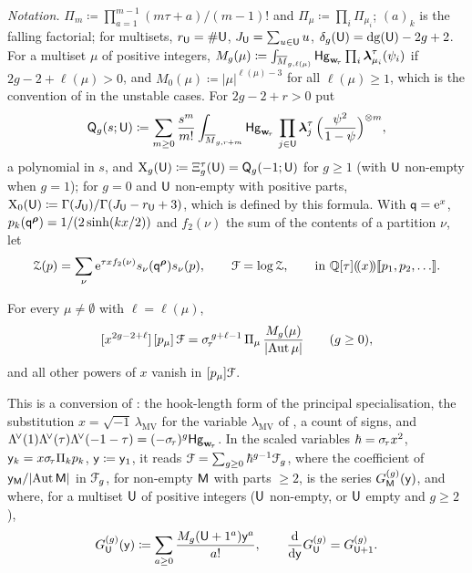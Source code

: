 \emph{Notation.} $\Pi_m\coloneqq\prod_{a=1}^{m-1}(m\tau+a)/(m-1)!$ and $\Pi_\mu\coloneqq\prod_i\Pi_{\mu_i}$; $(a)_k$ is the falling factorial; for multisets, $r_{\mathsf{U}}=\#\mathsf{U}$, $J_{\mathsf{U}}=\sum_{u\in\mathsf{U}}u$, $\delta_g(\mathsf{U})=\mathrm{dg}(\mathsf{U})-2g+2$. For a multiset $\mu$ of positive integers, $M_g(\mu)\coloneqq\int_{\overline{M}_{g,\ell(\mu)}}\mathsf{Hg}_{\mathbf{w}_{\!\tau}}\prod_i\boldsymbol{\lambda}^{\tau}_{\mu_i}(\psi_i)$ if $2g-2+\ell(\mu)>0$, and $M_0(\mu)\coloneqq\lvert\mu\rvert^{\ell(\mu)-3}$ for all $\ell(\mu)\geq 1$, which is the convention of \cite{LLZ03} in the unstable cases. For $2g-2+r>0$ put
\[
\mathsf{Q}_g(s;\mathsf{U})\coloneqq\sum_{m\geq 0}\frac{s^m}{m!}\int_{\overline{M}_{g,r+m}}\mathsf{Hg}_{\mathbf{w}_{\!\tau}}\,\prod_{j\in\mathsf{U}}\boldsymbol{\lambda}^{\tau}_j\,\Big(\frac{\psi^2}{1-\psi}\Big)^{\otimes m},
\]
a polynomial in $s$, and $\mathrm{X}_g(\mathsf{U})\coloneqq\Xi^{\tau}_g(\mathsf{U})=\mathsf{Q}_g(-1;\mathsf{U})$ for $g\geq1$ (with $\mathsf{U}$ non-empty when $g=1$); for $g=0$ and $\mathsf{U}$ non-empty with positive parts, $\mathrm{X}_0(\mathsf{U})\coloneqq\Gamma(J_{\mathsf{U}})/\Gamma(J_{\mathsf{U}}-r_{\mathsf{U}}+3)$, which is defined by this formula. With $\mathsf{q}=\mathrm{e}^x$, $p_k(\mathsf{q}^{\boldsymbol{\rho}})=1/(2\sinh(kx/2))$ and $f_2(\nu)$ the sum of the contents of a partition $\nu$, let
\[
\MVZ(p)=\sum_\nu\re^{\tau xf_2(\nu)}s_\nu(\mathsf{q}^{\bwy})s_\nu(p),\qquad \MVF=\log\MVZ,\qquad\text{in }\bbQ[\tau]\lser{x}\fps{p_1,p_2,\dots}.
\]

\begin{prop}\label{prop:van-real}
For every $\mu\neq\emptyset$ with $\ell=\ell(\mu)$,
\begin{equation}\label{eq:van-real}
[x^{2g-2+\ell}]\,[p_\mu]\,\mathcal{F}=\sigma_{\!\tau}^{\,g+\ell-1}\,\Pi_\mu\,\frac{M_g(\mu)}{\lvert\operatorname{Aut}\mu\rvert}\qquad(g\geq 0),
\end{equation}
and all other powers of $x$ vanish in $[p_\mu]\mathcal{F}$.
\end{prop}

This is a conversion of \cite[eq.~(1)--(3)]{LLZ03}: the hook-length form of the principal specialisation, the substitution $x=\sqrt{-1}\,\lambda_{\mathrm{MV}}$ for the variable $\lambda_{\mathrm{MV}}$ of \cite{LLZ03}, a count of signs, and $\Lambda^{\!\vee}(1)\Lambda^{\!\vee}(\tau)\Lambda^{\!\vee}(-1-\tau)=(-\sigma_{\!\tau})^g\mathsf{Hg}_{\mathbf{w}_{\!\tau}}$. In the scaled variables $\hbar=\sigma_{\!\tau} x^2$, $\mathsf{y}_k=x\sigma_{\!\tau}\Pi_kp_k$, $\mathsf{y}\coloneqq\mathsf{y}_1$, it reads $\mathcal{F}=\sum_{g\geq0}\hbar^{g-1}\mathcal{F}_g$, where the coefficient of $\mathsf{y}_{\mathsf{M}}/\lvert\operatorname{Aut}\mathsf{M}\rvert$ in $\mathcal{F}_g$, for non-empty $\mathsf{M}$ with parts $\geq2$, is the series $G^{(g)}_{\mathsf{M}}(\mathsf{y})$, and where, for a multiset $\mathsf{U}$ of positive integers ($\mathsf{U}$ non-empty, or $\mathsf{U}$ empty and $g\geq2$),
\begin{equation}\label{eq:van-G}
G^{(g)}_{\mathsf{U}}(\mathsf{y})\coloneqq\sum_{a\geq 0}\frac{M_g(\mathsf{U}+1^a)\mathsf{y}^a}{a!},\qquad \frac{\mathrm{d}}{\mathrm{d}\mathsf{y}}G^{(g)}_{\mathsf{U}}=G^{(g)}_{\mathsf{U}+1}.
\end{equation}

